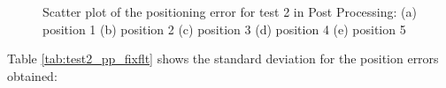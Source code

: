\begin{figure}[H] 
	\centering
    \newline
    \caption{Scatter plot of the positioning error for test 2 in Post Processing: (a) position 1 (b) position 2 (c) position 3 (d) position 4 (e) position 5}
	\label{FIG:test2_pp_scatter} 
\end{figure}

Table \ref{tab:test2_pp_fixflt} shows the standard deviation for the position errors obtained:


